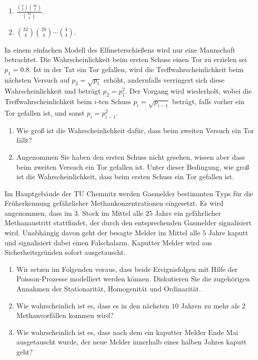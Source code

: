 \solution
\begin{enumerate}
    \item $\frac{\binom{2}{2} \binom{30}{2}}{\binom{32}{4}}$.
    \item $\binom{32}{4}\binom{28}{4} \cdots \binom{4}{4}$.
\end{enumerate}


 In einem einfachen Modell des Elfmeterschießens
wird nur eine Mannschaft betrachtet. Die Wahrscheinlichkeit beim ersten Schuss
einen Tor zu erzielen sei $p_{1}=0.8$. Ist in der Tat ein Tor gefallen, wird
die Treffwahrscheinlichkeit beim nächsten Versuch auf $p_2 = \sqrt{p_1}$
erhöht, andernfalls verringert sich diese Wahrscheinlichkeit und beträgt $p_2 =
p_{1}^{2}$. Der Vorgang wird wiederholt, wobei die Treffwahrscheinlichkeit beim
$i$-ten Schuss $p_{i}=\sqrt{p_{i-1}}$ beträgt, falls vorher ein Tor
gefallen ist, und sonst $p_i = p^{2}_{i-1}$.
\begin{enumerate}
    \item Wie groß ist die Wahrscheinlichkeit dafür, dass beim zweiten Versuch
        ein Tor fällt?
        
    \item Angenommen Sie haben den ersten Schuss nicht gesehen, wissen aber
        dass beim zweiten Versuch ein Tor gefallen ist. Unter dieser Bedingung,
        wie groß ist die Wahrscheinlichkeit, dass beim ersten Schuss ein Tor
        gefallen ist. 
\end{enumerate}




 Im Hauptgebäude der TU Chemnitz werden Gasmelder
bestimmten Typs für die Früherkennung gefährlicher Methankonzentrationen
eingesetzt. Es wird angenommen, dass im $3.$ Stock im Mittel alle $25$ Jahre
ein gefährlicher Methanaustritt stattfindet, der durch den entsprechenden
Gasmelder signalisiert wird. Unabhängig davon geht der besagte Melder im Mittel
alle $5$ Jahre kaputt und signalisiert dabei einen Falschalarm. Kaputter Melder
wird aus Sicherheitsgründen sofort ausgetauscht. 
\begin{enumerate}
    \item Wir setzen im Folgenden voraus, dass beide Ereignisfolgen mit Hilfe
        der Poisson-Prozesse modelliert werden können. Diskutieren Sie die 
        zugehörigen Annahmen der Stationarität, Homogenität und Ordinarität.

    \item Wie wahrscheinlich ist es, dass es in den nächsten $10$ Jahren zu mehr als
        $2$ Methanvorfällen kommen wird?

    \item Wie wahrscheinlich ist es, dass nach dem ein kaputter Melder Ende Mai ausgetauscht
        wurde, der neue Melder innerhalb eines halben Jahres kaputt geht?
\end{enumerate}



